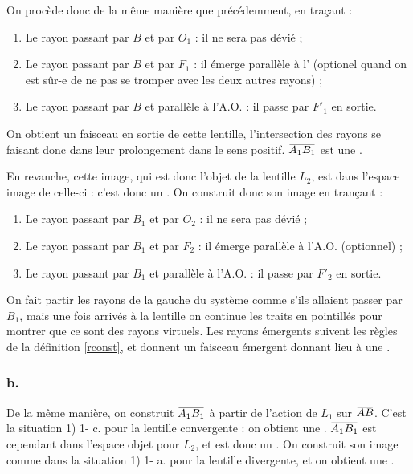 \documentclass[10pt,a5paper,notitlepage]{book}
\begin{document}
On procède donc de la même manière que précédemment, en traçant :
\begin{enumerate}
    \item Le rayon passant par $B$ et par $O_1$ : il ne sera pas dévié ;
    \item Le rayon passant par $B$ et par $F_1$ : il émerge parallèle à
        l' (optionel quand on est sûr-e de ne pas se
        tromper avec les deux autres rayons) ;
    \item Le rayon passant par $B$ et parallèle à l'A.O. : il passe par $F'_1$
        en sortie.
\end{enumerate}

On obtient un faisceau  en sortie de cette lentille,
l'intersection des rayons se faisant donc dans leur prolongement dans le sens
positif. $\ABa$ est une  . \bigbreak

En revanche, cette image, qui est donc l'objet de la lentille $L_2$, est dans
l'espace image de celle-ci : c'est donc un  . On construit donc son image en trançant :

\begin{enumerate}
    \item Le rayon passant par $B_1$ et par $O_2$ : il ne sera pas dévié ;
    \item Le rayon passant par $B_1$ et par $F_2$ : il émerge parallèle à l'A.O.
        (optionnel) ;
    \item Le rayon passant par $B_1$ et parallèle à l'A.O. : il passe par $F'_2$
        en sortie.
\end{enumerate}

On fait partir les rayons de la gauche du système comme s'ils allaient passer
par $B_1$, mais une fois arrivés à la lentille on continue les traits en
pointillés pour montrer que ce sont des rayons virtuels. Les rayons émergents
suivent les règles de la définition \ref{rconst}, et donnent un faisceau
émergent  donnant lieu à une .

\subsubsection{b.}
De la même manière, on construit $\ABa$ à partir de l'action de $L_1$ sur $\ABb$.
C'est la situation 1) 1- c. pour la lentille convergente : on obtient une
 . $\ABa$ est cependant dans l'espace
objet pour $L_2$, et est donc un  . On
construit son image comme dans la situation 1) 1- a. pour la lentille
divergente, et on obtient une .
\end{document}
